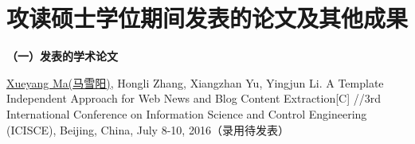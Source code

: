 \chapter*{攻读硕士学位期间发表的论文及其他成果}
{}

\noindent\textbf{（一）发表的学术论文}
\begin{publist}
\item	\underline{Xueyang Ma(马雪阳)}, Hongli Zhang, Xiangzhan Yu, Yingjun Li. 
A Template Independent Approach for Web News and Blog Content Extraction[C] 
//3rd International Conference on Information Science and Control Engineering
 (ICISCE), Beijing, China, July 8-10, 2016（录用待发表）
\end{publist}
